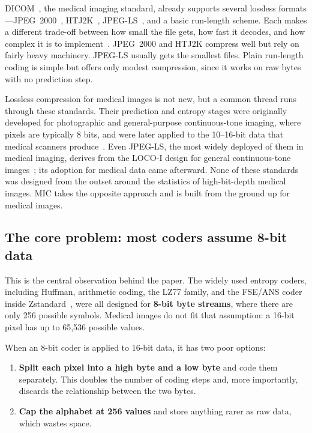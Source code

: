 \documentclass[journal]{IEEEtran}
\begin{document}
DICOM~\cite{dicom}, the medical imaging standard, already supports several
lossless formats---JPEG~2000~\cite{taubman2002}, HTJ2K~\cite{htj2k2019},
JPEG-LS~\cite{loco1}, and a basic run-length scheme. Each makes a different
trade-off between how small the file gets, how fast it decodes, and how complex
it is to implement~\cite{liu2017,clunie2000}. JPEG~2000 and HTJ2K compress well
but rely on fairly heavy machinery. JPEG-LS usually gets the smallest files.
Plain run-length coding is simple but offers only modest compression, since it
works on raw bytes with no prediction step.

Lossless compression for medical images is not new, but a common thread runs
through these standards. Their prediction and entropy stages were originally
developed for photographic and general-purpose continuous-tone imaging, where
pixels are typically 8 bits, and were later applied to the 10--16-bit data that
medical scanners produce~\cite{liu2017,clunie2000}. Even JPEG-LS, the most
widely deployed of them in medical imaging, derives from the LOCO-I design for
general continuous-tone images~\cite{loco1}; its adoption for medical data came
afterward. None of these standards was designed from the outset around the
statistics of high-bit-depth medical images. MIC takes the opposite approach
and is built from the ground up for medical images.

\subsection{The core problem: most coders assume 8-bit data}

This is the central observation behind the paper. The widely used entropy
coders, including Huffman, arithmetic coding, the LZ77 family, and the FSE/ANS
coder inside Zstandard~\cite{rfc8878}, were all designed for \textbf{8-bit byte
streams}, where there are only 256 possible symbols. Medical images do not fit
that assumption: a 16-bit pixel has up to 65,536 possible values.

When an 8-bit coder is applied to 16-bit data, it has two poor options:

\begin{enumerate}
  \item \textbf{Split each pixel into a high byte and a low byte} and code them
  separately. This doubles the number of coding steps and, more importantly,
  discards the relationship between the two bytes.
  \item \textbf{Cap the alphabet at 256 values} and store anything rarer as raw
  data, which wastes space.
\end{enumerate}
\end{document}
